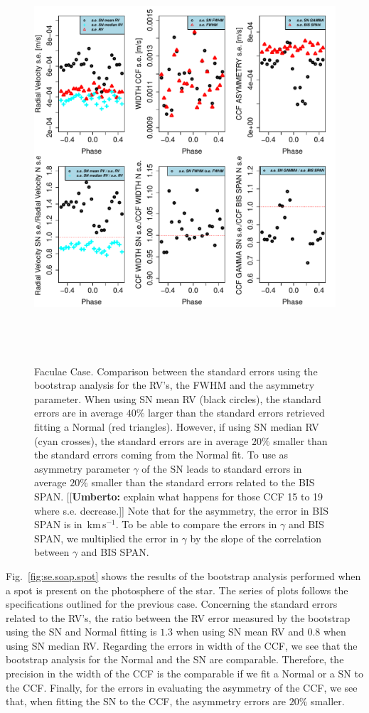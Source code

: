 \documentclass[11pt, oneside]{article}
\def\kms{\hbox{\,km\,s$^{-1}$}}       %
\newcommand{\umberto}[1]{{\color{green}[[\textbf{Umberto: }#1]]}}
\begin{document}
\begin{figure}[htbp]
   \centering
\includegraphics[height = 6in]{RV_comparison_FACULAE_standard_errors.pdf} 
   \caption{Faculae Case. Comparison between the standard errors using the bootstrap analysis for the RV's, the FWHM and the asymmetry parameter. When using SN mean RV (black circles), the standard errors are in average $40\%$ larger than the standard errors retrieved fitting a Normal (red triangles). However, if using SN median RV (cyan crosses), the standard errors are in average $20\%$ smaller than the standard errors coming from the Normal fit. To use as asymmetry parameter $\gamma$ of the SN leads to standard errors in average $20\%$ smaller than the standard errors related to the BIS SPAN. \umberto{explain what happens for those CCF 15 to 19 where s.e. decrease.} Note that for the asymmetry, the error in BIS SPAN is in \kms. To be able to compare the errors in $\gamma$ and BIS SPAN, we multiplied the error in $\gamma$ by the slope of the correlation between $\gamma$ and BIS SPAN.}
   \label{fig:se.soap.faculae}
\end{figure}

Fig.~\ref{fig:se.soap.spot} shows the results of the bootstrap analysis performed when a spot is present on the photosphere of the star. The series of plots follows the specifications outlined for the previous case. Concerning the standard errors related to the RV's, the ratio between the RV error measured by the bootstrap using the SN and Normal fitting is $1.3$ when using SN mean RV and $0.8$ when using SN median RV. Regarding the errors in width of the CCF, we see that the bootstrap analysis for the Normal and the SN are comparable. Therefore, the precision in the width of the CCF is the comparable if we fit a Normal or a SN to the CCF. Finally, for the errors in evaluating the asymmetry of the CCF, we see that, when fitting the SN to the CCF, the asymmetry errors are $20\%$ smaller.
\end{document}
